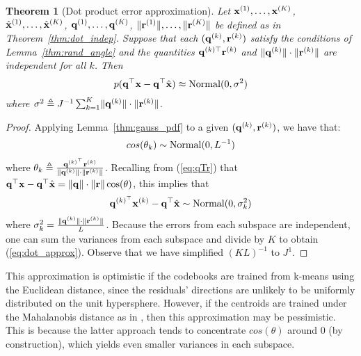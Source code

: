 \documentclass[]{article}
\newtheorem{theorem}{Theorem}[section]
\begin{document}
\begin{theorem}[Dot product error approximation] \label{thm:dot_approx}
Let $\mathbf{x}^{(1)},\ldots,\mathbf{x}^{(K)}$, $\hat{\mathbf{x}}^{(1)},\ldots,\hat{\mathbf{x}}^{(K)}$, $\mathbf{q}^{(1)},\ldots,\mathbf{q}^{(K)}$, $\lVert \mathbf{r}^{(1)} \rVert,\ldots,\lVert \mathbf{r}^{(K)} \rVert$ be defined as in Theorem~\ref{thm:dot_indep}. Suppose that each $(\mathbf{q}^{(k)}, \mathbf{r}^{(k)})$ satisfy the conditions of Lemma~\ref{thm:rand_angle} and the quantities $\mathbf{q}^{(k)\top} \mathbf{r}^{(k)}$ and $\lVert \mathbf{q}^{(k)} \rVert \cdot \lVert \mathbf{r}^{(k)} \rVert$ are independent for all $k$. Then
\begin{align} \label{eq:dot_approx}
    p(\mathbf{q}^\top \mathbf{x} - \mathbf{q}^\top \hat{\mathbf{x}}) \approx \operatorname{Normal}(0, \sigma^2)
\end{align}
where $\sigma^2 \triangleq J^{-1} \sum_{k=1}^K \lVert\mathbf{q}^{(k)} \rVert \cdot \lVert\mathbf{r}^{(k)} \rVert$.
\end{theorem}

\begin{proof}
Applying Lemma~\ref{thm:gauss_pdf} to a given $(\mathbf{q}^{(k)}, \mathbf{r}^{(k)})$, we have that:
\begin{align}
    cos(\theta_k) \sim \operatorname{Normal}(0, L^{-1})
\end{align}
where $\theta_k \triangleq \frac{ \mathbf{q}^{(k)^\top}\mathbf{r}^{(k)} }{ \lVert\mathbf{q}^{(k)}\rVert \cdot \lVert\mathbf{r}^{(k)}\rVert }$. Recalling from (\ref{eq:qTr}) that $\mathbf{q}^\top \mathbf{x} - \mathbf{q}^\top \hat{\mathbf{x}} = \lVert\mathbf{q}\rVert \cdot \lVert\mathbf{r}\rVert \cos(\theta)$, this implies that
\begin{align}
    \mathbf{q}^{(k)^\top} \mathbf{x}^{(k)} - \mathbf{q}^\top \hat{\mathbf{x}} \sim \operatorname{Normal}(0, \sigma_k^2)
\end{align}
where $\sigma_k^2 = \frac{ \lVert\mathbf{q}^{(k)}\rVert \cdot \lVert\mathbf{r}^{(k)}\rVert }{ L }$.
Because the errors from each subspace are independent, one can sum the variances from each subspace and divide by $K$ to obtain (\ref{eq:dot_approx}). Observe that we have simplified $(KL)^{-1}$ to $J^1$.
\end{proof}

This approximation is optimistic if the codebooks are trained from k-means using the Euclidean distance, since the residuals' directions are unlikely to be uniformly distributed on the unit hypersphere. However, if the centroids are trained under the Mahalanobis distance as in \cite{googleMips, pairQ}, then this approximation may be pessimistic. This is because the latter approach tends to concentrate $cos(\theta)$ around $0$ (by construction), which yields even smaller variances in each subspace.
\end{document}
